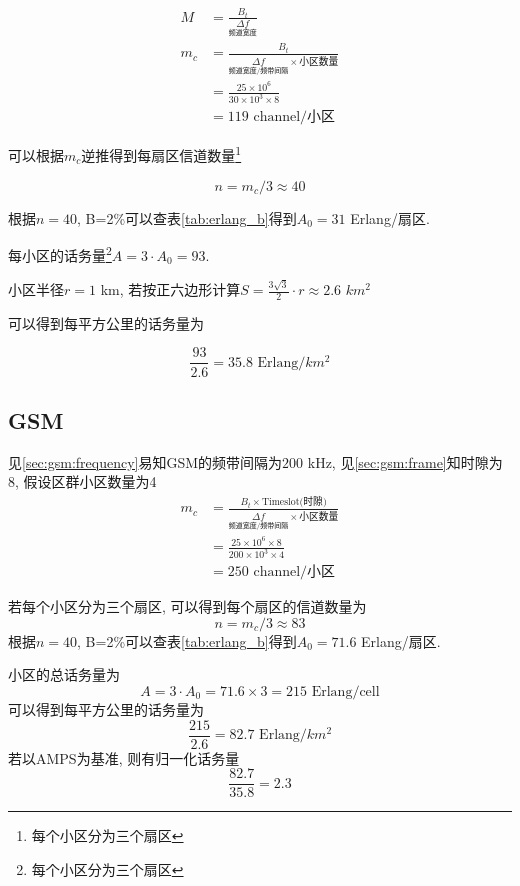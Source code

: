 \documentclass[a4paper]{report}
\begin{document}
\begin{align*}
	M&=\frac{B_t}{\underset{\text{频道宽度}}{\Delta f}}\\
	m_c&=\frac{B_t}{\underset{\text{频道宽度/频带间隔}}{\Delta f}\times \text{小区数量}} \\
	&=\frac{25\times 10^6}{30\times 10^3\times 8}\\
	&= 119 \text{ channel/小区}
\end{align*}

可以根据$m_c$逆推得到每扇区信道数量\footnote{每个小区分为三个扇区}

\begin{equation}
	n=m_c/3\approx 40
\end{equation}

根据$n=40$, B=2\%可以查表\ref{tab:erlang_b}得到$A_0=31$ Erlang/扇区. 

每小区的话务量\footnote{每个小区分为三个扇区}$A=3\cdot A_0=93$. 

小区半径$r=1$ km, 若按正六边形计算$S=\frac{3\sqrt{3}}{2}\cdot r\approx 2.6$ $km^2$

可以得到每平方公里的话务量为

\begin{equation}
	\frac{93}{2.6}=35.8 \text{ Erlang/$km^2$}
\end{equation}
\subsection{GSM}
见\ref{sec:gsm:frequency}易知GSM的频带间隔为$200$ kHz, 见\ref{sec:gsm:frame}知时隙为8, 假设区群小区数量为4
\begin{align*}
	m_c&=\frac{B_t\times \text{Timeslot(时隙)}}{\underset{\text{频道宽度/频带间隔}}{\Delta f}\times \text{小区数量}} \\
	&=\frac{25\times 10^6\times 8}{200\times 10^3\times 4}\\
	&= 250 \text{ channel/小区}
\end{align*}

若每个小区分为三个扇区, 可以得到每个扇区的信道数量为
\begin{equation}
	n=m_c/3\approx 83
\end{equation}
根据$n=40$, B=2\%可以查表\ref{tab:erlang_b}得到$A_0=71.6$ Erlang/扇区. 

小区的总话务量为
\begin{equation}
	A=3\cdot A_0 = 71.6\times 3=215 \text{ Erlang/cell}
\end{equation}
可以得到每平方公里的话务量为
\begin{equation}
	\frac{215}{2.6}=82.7 \text{ Erlang/$km^2$}
\end{equation}
若以AMPS为基准, 则有归一化话务量
\begin{equation}
	\frac{82.7}{35.8}=2.3
\end{equation}
\end{document}
